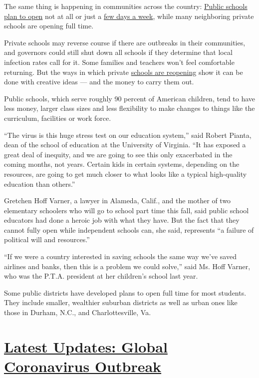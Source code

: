 The same thing is happening in communities across the country:
\href{https://www.nytimes.com/2020/08/03/us/school-closing-coronavirus.html}{Public
schools plan to open} not at all or just a
\href{https://www.nytimes.com/2020/07/08/nyregion/nyc-schools-reopening-plan.html}{few
days a week}, while many neighboring private schools are opening full
time.

Private schools may reverse course if there are outbreaks in their
communities, and governors could still shut down all schools if they
determine that local infection rates call for it. Some families and
teachers won't feel comfortable returning. But the ways in which private
\href{https://www.nytimes.com/interactive/2020/07/31/us/coronavirus-school-reopening-risk.html}{schools
are reopening} show it can be done with creative ideas --- and the money
to carry them out.

Public schools, which serve roughly 90 percent of American children,
tend to have less money, larger class sizes and less flexibility to make
changes to things like the curriculum, facilities or work force.

``The virus is this huge stress test on our education system,'' said
Robert Pianta, dean of the school of education at the University of
Virginia. ``It has exposed a great deal of inequity, and we are going to
see this only exacerbated in the coming months, not years. Certain kids
in certain systems, depending on the resources, are going to get much
closer to what looks like a typical high-quality education than
others.''

Gretchen Hoff Varner, a lawyer in Alameda, Calif., and the mother of two
elementary schoolers who will go to school part time this fall, said
public school educators had done a heroic job with what they have. But
the fact that they cannot fully open while independent schools can, she
said, represents ``a failure of political will and resources.''

``If we were a country interested in saving schools the same way we've
saved airlines and banks, then this is a problem we could solve,'' said
Ms. Hoff Varner, who was the P.T.A. president at her children's school
last year.

Some public districts have developed plans to open full time for most
students. They include smaller, wealthier suburban districts as well as
urban ones like those in Durham, N.C., and Charlottesville, Va.

\hypertarget{latest-updates-global-coronavirus-outbreak}{%
\section{\texorpdfstring{\href{https://www.nytimes.com/2020/08/04/world/coronavirus-covid-19.html?action=click\&pgtype=Article\&state=default\&region=MAIN_CONTENT_1\&context=storylines_live_updates}{Latest
Updates: Global Coronavirus
Outbreak}}{Latest Updates: Global Coronavirus Outbreak}}\label{latest-updates-global-coronavirus-outbreak}}

